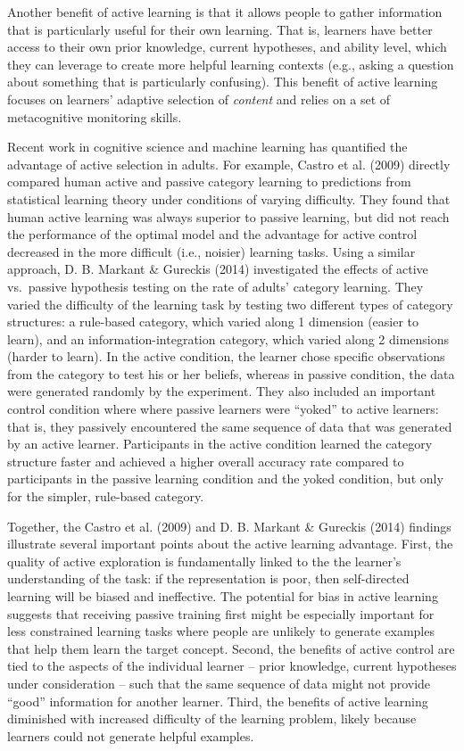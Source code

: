 \documentclass[a4paper,man,apacite,floatsintext]{apa6}
\begin{document}
Another benefit of active learning is that it allows people to gather
information that is particularly useful for their own learning. That is,
learners have better access to their own prior knowledge, current
hypotheses, and ability level, which they can leverage to create more
helpful learning contexts (e.g., asking a question about something that
is particularly confusing). This benefit of active learning focuses on
learners' adaptive selection of \emph{content} and relies on a set of
metacognitive monitoring skills.

Recent work in cognitive science and machine learning has quantified the
advantage of active selection in adults. For example, Castro et al.
(2009) directly compared human active and passive category learning to
predictions from statistical learning theory under conditions of varying
difficulty. They found that human active learning was always superior to
passive learning, but did not reach the performance of the optimal model
and the advantage for active control decreased in the more difficult
(i.e., noisier) learning tasks. Using a similar approach, D. B. Markant
\& Gureckis (2014) investigated the effects of active vs.~passive
hypothesis testing on the rate of adults' category learning. They varied
the difficulty of the learning task by testing two different types of
category structures: a rule-based category, which varied along 1
dimension (easier to learn), and an information-integration category,
which varied along 2 dimensions (harder to learn). In the active
condition, the learner chose specific observations from the category to
test his or her beliefs, whereas in passive condition, the data were
generated randomly by the experiment. They also included an important
control condition where where passive learners were ``yoked'' to active
learners: that is, they passively encountered the same sequence of data
that was generated by an active learner. Participants in the active
condition learned the category structure faster and achieved a higher
overall accuracy rate compared to participants in the passive learning
condition and the yoked condition, but only for the simpler, rule-based
category.

Together, the Castro et al. (2009) and D. B. Markant \& Gureckis (2014)
findings illustrate several important points about the active learning
advantage. First, the quality of active exploration is fundamentally
linked to the the learner's understanding of the task: if the
representation is poor, then self-directed learning will be biased and
ineffective. The potential for bias in active learning suggests that
receiving passive training first might be especially important for less
constrained learning tasks where people are unlikely to generate
examples that help them learn the target concept. Second, the benefits
of active control are tied to the aspects of the individual learner --
prior knowledge, current hypotheses under consideration -- such that the
same sequence of data might not provide ``good'' information for another
learner. Third, the benefits of active learning diminished with
increased difficulty of the learning problem, likely because learners
could not generate helpful examples.
\end{document}
